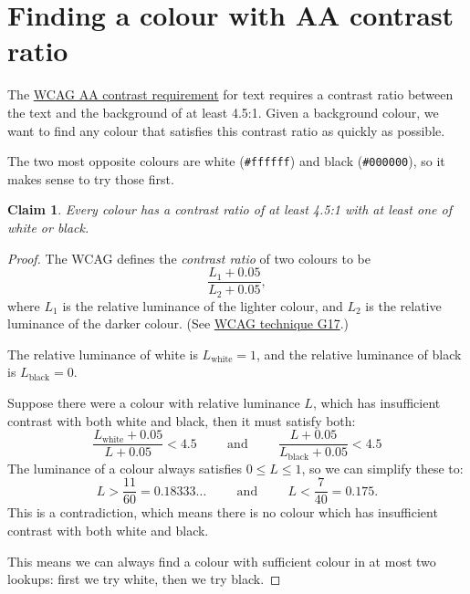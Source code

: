 \documentclass[12pt]{article}
\newtheorem*{claim}{Claim}
\begin{document}
  \section*{Finding a colour with AA contrast ratio} %
  \label{sec:the_problem}

  The \href{https://www.w3.org/TR/2008/REC-WCAG20-20081211/#visual-audio-contrast-contrast}{WCAG AA contrast requirement} for text requires a contrast ratio between the text and the background of at least 4.5:1.
  Given a background colour, we want to find any colour that satisfies this contrast ratio as quickly as possible.

  The two most opposite colours are white (\texttt{\#ffffff}) and black (\texttt{\#000000}), so it makes sense to try those first.

  \begin{claim}
    Every colour has a contrast ratio of at least 4.5:1 with at least one of white  or black.
  \end{claim}

  \begin{proof}
    The WCAG defines the \emph{contrast ratio} of two colours to be
    \begin{equation}
      \frac{L_1 + 0.05}{L_2 + 0.05},
    \end{equation}
    where $L_1$ is the relative luminance of the lighter colour, and $L_2$ is the relative luminance of the darker colour.
    (See \href{https://www.w3.org/TR/WCAG20-TECHS/G17.html}{WCAG technique G17}.)

    The relative luminance of white is $L_\text{white} = 1$, and the relative luminance of black is $L_\text{black} = 0$.

    Suppose there were a colour with relative luminance $L$, which has insufficient contrast with both white and black, then it must satisfy both:
    \begin{equation*}
      \frac{L_\text{white} + 0.05}{L + 0.05} < 4.5
      \hspace{1cm} \text{and} \hspace{1cm}
      \frac{L + 0.05}{L_\text{black} + 0.05} < 4.5
    \end{equation*}
    The luminance of a colour always satisfies $0 \leq L \leq 1$, so we can simplify these to:
    \begin{equation*}
      L > \frac{11}{60} = 0.18333\ldots
      \hspace{1cm} \text{and} \hspace{1cm}
      L < \frac{7}{40} = 0.175.
    \end{equation*}
    This is a contradiction, which means there is no colour which has insufficient contrast with both white and black.

    This means we can always find a colour with sufficient colour in at most two lookups: first we try white, then we try black.
  \end{proof}
\end{document}
